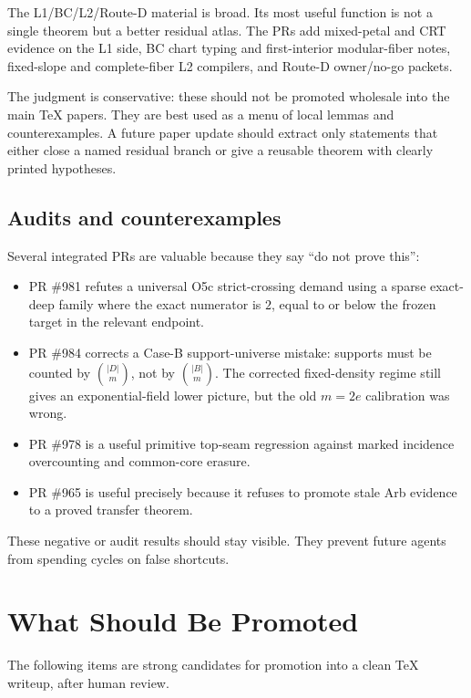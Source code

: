 \documentclass[a4paper,11pt]{amsart}
\begin{document}
The L1/BC/L2/Route-D material is broad.  Its most useful function is not a
single theorem but a better residual atlas.  The PRs add mixed-petal and CRT
evidence on the L1 side, BC chart typing and first-interior modular-fiber
notes, fixed-slope and complete-fiber L2 compilers, and Route-D owner/no-go
packets.

The judgment is conservative: these should not be promoted wholesale into the
main TeX papers.  They are best used as a menu of local lemmas and
counterexamples.  A future paper update should extract only statements that
either close a named residual branch or give a reusable theorem with clearly
printed hypotheses.

\subsection{Audits and counterexamples}

Several integrated PRs are valuable because they say ``do not prove this'':
\begin{itemize}
\item PR \#981 refutes a universal O5c strict-crossing demand using a sparse
exact-deep family where the exact numerator is \(2\), equal to or below the
frozen target in the relevant endpoint.
\item PR \#984 corrects a Case-B support-universe mistake: supports must be
counted by \(\binom{|D|}{m}\), not by \(\binom{|B|}{m}\).  The corrected
fixed-density regime still gives an exponential-field lower picture, but the
old \(m=2e\) calibration was wrong.
\item PR \#978 is a useful primitive top-seam regression against marked
incidence overcounting and common-core erasure.
\item PR \#965 is useful precisely because it refuses to promote stale Arb
evidence to a proved transfer theorem.
\end{itemize}
These negative or audit results should stay visible.  They prevent future
agents from spending cycles on false shortcuts.

\section{What Should Be Promoted}

The following items are strong candidates for promotion into a clean TeX
writeup, after human review.
\end{document}
